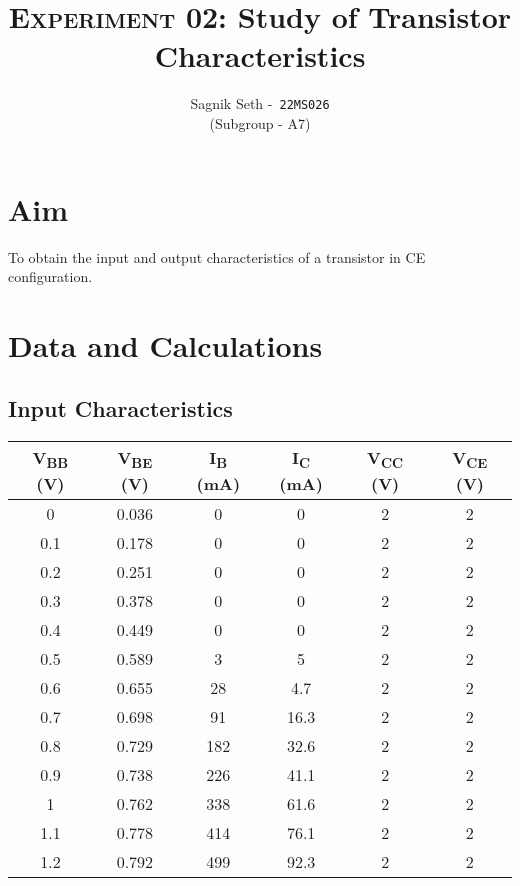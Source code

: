 \documentclass{scrartcl}
\title{
        \Large\textsc{Experiment 02: }
        \huge\textbf{Study of Transistor Characteristics} \\
}
\author{{\Large Sagnik Seth} -\   \texttt{22MS026}\\ ({\small Subgroup - A7}) }
\date{}
\begin{document}
\maketitle
\section{Aim}
To obtain the input and output characteristics of a transistor in CE configuration.
 
\section{Data and Calculations}
\subsection{Input Characteristics}
\begin{table}[H]
    \centering
    \begin{tabular}{|c|c|c|c|c|c|}
        \hline
    \textbf{V\textsubscript{BB} (V)}  & \textbf{V\textsubscript{BE} (V)} &\textbf{I\textsubscript{B} (mA)} & \textbf{I\textsubscript{C} (mA)} & \textbf{V\textsubscript{CC} (V)} &  \textbf{V\textsubscript{CE} (V)} \\
    \hline 
    0         & 0.036     & 0            & 0            & 2     & 2             \\ \hline
    0.1       & 0.178     & 0            & 0            & 2     & 2             \\ \hline
    0.2       & 0.251     & 0            & 0            & 2     & 2             \\ \hline
    0.3       & 0.378     & 0            & 0            & 2     & 2             \\ \hline
    0.4       & 0.449     & 0            & 0            & 2     & 2             \\ \hline
    0.5       & 0.589     & 3            & 5            & 2     & 2             \\ \hline
    0.6       & 0.655     & 28           & 4.7          & 2     & 2             \\ \hline 
    0.7       & 0.698     & 91           & 16.3         & 2     & 2             \\ \hline
    0.8       & 0.729     & 182          & 32.6         & 2     & 2             \\ \hline
    0.9       & 0.738     & 226          & 41.1         & 2     & 2             \\ \hline
    1         & 0.762     & 338          & 61.6         & 2     & 2             \\ \hline 
    1.1       & 0.778     & 414          & 76.1         & 2     & 2             \\ \hline
    1.2       & 0.792     & 499          & 92.3         & 2     & 2             \\ 
    \hline
    \end{tabular}
    \end{table}
\end{document}
